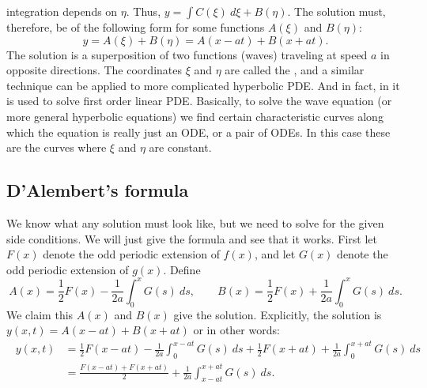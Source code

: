 integration depends on $\eta$.
Thus,
$y = \int C(\xi) ~ d\xi + B(\eta)$.
The solution must, therefore, be of the following form for some functions
$A(\xi)$ and $B(\eta)$:
\begin{equation*}
y = A(\xi) + B(\eta) = A(x-at) + B(x+at) .
\end{equation*}
The solution is a superposition of two functions (waves) traveling at speed
$a$
in opposite directions.  The coordinates $\xi$ and $\eta$ are called the
\emph{}, and a similar technique can
be applied to more complicated hyperbolic PDE\@.
And in fact, in  it is used to solve first
order linear PDE\@.  Basically, to solve the wave equation (or more general
hyperbolic equations) we find certain characteristic curves along which
the equation is really just an ODE\@, or a pair of ODEs.  In this case
these are the curves where $\xi$ and $\eta$ are constant.

\subsection{D'Alembert's formula}

We know what any solution must look like, but we need to solve for the
given side conditions.  We will just give the formula and see that it works.
First let $F(x)$
denote the odd periodic extension of $f(x)$, and let $G(x)$ denote the
odd periodic extension of $g(x)$.  Define
\begin{equation*}
A(x) = \frac{1}{2} F(x) - \frac{1}{2a} \int_0^x G(s) ~ds ,
\qquad
B(x) = \frac{1}{2} F(x) + \frac{1}{2a} \int_0^x G(s) ~ds .
\end{equation*}
We claim this $A(x)$ and $B(x)$ give the solution.  Explicitly, the
solution is $y(x,t) = A(x-at) + B(x+at)$ or in other words:
\begin{equation} \label{dalemb:form}
\boxed{~~
\begin{aligned}
y(x,t) & =
\frac{1}{2} F(x-at) - \frac{1}{2a} \int_0^{x-at} G(s) ~ds 
+
\frac{1}{2} F(x+at) + \frac{1}{2a} \int_0^{x+at} G(s) ~ds \\
& =
\frac{F(x-at) + F(x+at)}{2} + \frac{1}{2a} \int_{x-at}^{x+at} G(s) ~ds .
\end{aligned}
~~}
\end{equation}


